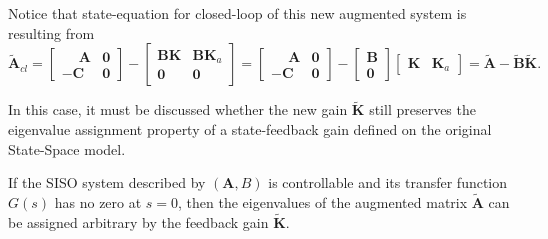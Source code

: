 \documentclass[a4paper,11pt]{book}
\numberwithin{figure}{chapter}
\numberwithin{equation}{chapter}
\numberwithin{table}{chapter}
\newtheorem{theorem}{Theorem}[chapter]
\theoremstyle{definition}
\newcounter{boxed-theorem}
\newenvironment{boxed-theorem}[1]
{\colorlet{shadecolor}{pastelBlue2!5} \begin{shaded} \begin{theorem}{#1}}
{\end{theorem} \end{shaded}}
\newcounter{boxed-lemma}
\newcounter{boxed-definition}
\newcounter{boxed-example}
\begin{document}
Notice that state-equation for closed-loop of this new augmented system is resulting from
\begin{equation}  \label{eq:augmentedSystem02} 
	\tilde{\bm{A}}_{cl} = \begin{bmatrix} \phantom{-}\bm{A} & \bm{0} \\ -\bm{C} & \bm{0} \end{bmatrix} - \begin{bmatrix} \bm{B} \bm{K} & \bm{B} \bm{K}_a \\ \bm{0} & \bm{0} \end{bmatrix} = \begin{bmatrix} \phantom{-}\bm{A} & \bm{0} \\ -\bm{C} & \bm{0} \end{bmatrix} - \begin{bmatrix} \bm{B} \\ \bm{0} \end{bmatrix} \begin{bmatrix} \bm{K} & \bm{K}_a \end{bmatrix} = \tilde{\bm{A}} - \tilde{\bm{B}} \tilde{\bm{K}}
.\end{equation}

\noindent In this case, it must be discussed whether the new gain $\tilde{\bm{K}}$ still preserves the eigenvalue assignment property of a state-feedback gain defined on the original State-Space model.

\begin{boxed-theorem}{} \label{th:augmentedCtrb}
    If the SISO system described by $(\bm{A}, B)$ is controllable and its transfer function $G(s)$ has no zero at $s = 0$, then the eigenvalues of the augmented matrix $\tilde{\bm{A}}$ can be assigned arbitrary by the feedback gain $\tilde{\bm{K}}$.
\end{boxed-theorem}
\end{document}
